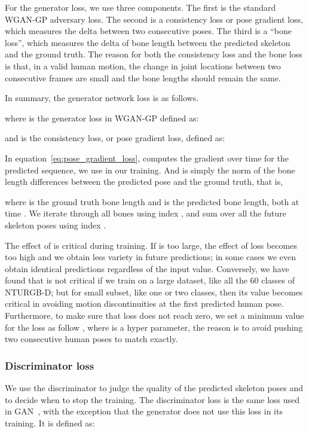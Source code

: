 \documentclass[10pt,twocolumn,letterpaper]{article}
\begin{document}
For the generator loss, we use three components. The first is the standard WGAN-GP adversary loss. The second is a consistency loss or pose gradient loss, which measures the delta between two consecutive poses. The third is a ``bone loss'', which measures the delta of bone length between the predicted skeleton and the ground truth. The reason for both the consistency loss and the bone loss is that, in a valid human motion, the change in joint locations between two consecutive frames are small and the bone lengths should remain the same.  

In summary, the generator network loss is as follows.


where  is the generator loss in WGAN-GP defined as:


and  is the consistency loss, or pose gradient loss, defined as:


In equation~\ref{eq:pose_gradient_loss},  computes the gradient over time for the predicted sequence, we use  in our training. And  is simply the  norm of the bone length differences between the predicted pose and the ground truth, that is,


where  is the ground truth bone length and  is the predicted bone length, both at time . We iterate through all bones using index , and sum over all the future skeleton poses using index .

The effect of  is critical during training. If  is too large, the effect of  loss becomes too high and we obtain less variety in future predictions; in some cases we even obtain identical predictions regardless of the input  value. Conversely, we have found that  is not critical if we train on a large dataset, like all the 60 classes of NTURGB-D; but for small subset, like one or two classes, then its value becomes critical in avoiding motion discontinuities at the first predicted human pose. Furthermore, to make sure that  loss does not reach zero, we set a minimum value for the loss as follow , where  is a hyper parameter, the reason is to avoid pushing two consecutive human poses to match exactly. 

\subsubsection{Discriminator loss}
We use the discriminator to judge the quality of the predicted skeleton poses and to decide when to stop the training. The discriminator loss is the same loss used in GAN~\cite{nips2014:Goodfellow}, with the exception that the generator does not use this loss in its training. It is defined as:
\end{document}
